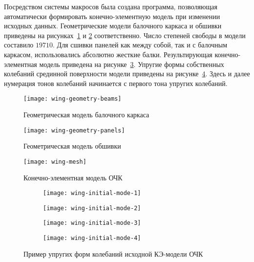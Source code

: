 Посредством системы макросов  была создана программа, позволяющая автоматически формировать конечно-элементную модель при изменении исходных данных. Геометрические модели балочного каркаса и обшивки приведены на рисунках~\ref{fig:wing-geometry-beams} и \ref{fig:wing-geometry-panels} соответственно. Число степеней свободы в модели составило $ 19710 $. Для сшивки панелей как между собой, так и с балочным каркасом, использовались абсолютно жесткие балки. Результирующая конечно-элементная модель приведена на рисунке~\ref{fig:wing-mesh}. Упругие формы собственных колебаний срединной поверхности модели приведены на рисунке~\ref{fig:wing-initial-mode}. Здесь и далее нумерация тонов колебаний начинается с первого тона упругих колебаний. 

\begin{figure}[!htb]
	\centerfloat
	\texttt{[image: wing-geometry-beams]}
	\caption{Геометрическая модель балочного каркаса}\label{fig:wing-geometry-beams}
\end{figure}

\begin{figure}[!htb]
	\centerfloat
	\texttt{[image: wing-geometry-panels]}
	\caption{Геометрическая модель обшивки}\label{fig:wing-geometry-panels}
\end{figure}

\begin{figure}[H]
	\centerfloat
	\texttt{[image: wing-mesh]}
	\caption{Конечно-элементная модель ОЧК} \label{fig:wing-mesh}
\end{figure}

\def\sfWing{0.48\textwidth}

\begin{figure}[!htb]
	\centering
	\begin{subfigure}[t]{\sfWing}
		\centering
		\texttt{[image: wing-initial-mode-1]}
	\end{subfigure}
	\hfill
	\begin{subfigure}[t]{\sfWing}
		\centering
		\texttt{[image: wing-initial-mode-2]}
	\end{subfigure}	
	\begin{subfigure}[t]{\sfWing}
		\centering
		\texttt{[image: wing-initial-mode-3]}
	\end{subfigure}	
	\hfill
	\begin{subfigure}[t]{\sfWing}
		\centering
		\texttt{[image: wing-initial-mode-4]}
	\end{subfigure}	
	\caption{Пример упругих форм колебаний исходной КЭ-модели ОЧК} \label{fig:wing-initial-mode}
\end{figure}

